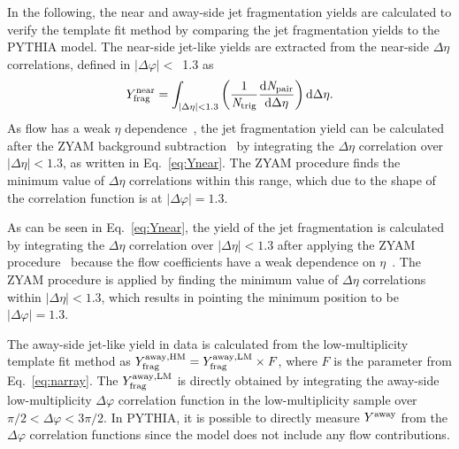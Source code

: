In the following, the near and away-side jet fragmentation yields are calculated to verify the template fit method by comparing the jet fragmentation yields to the PYTHIA model.
The near-side jet-like yields are extracted from the near-side $\Delta\eta$ correlations, defined in $|\Delta\varphi|<$~1.3 as
\begin{eqnarray}
Y^\mathrm{near}_{\rm{frag}} = \int_{|\Delta \eta|<1.3} \left( \frac{1}{\it{N}_{\rm{trig}}} \frac{ \rm{d}\it{}N_{\rm{pair}} }{ \rm{d}\Delta\eta } \right) \rm{d} \Delta\eta.
\label{eq:Ynear}
\end{eqnarray}
As flow has a weak $\eta$ dependence~\cite{ATLAS:2011ah,PHENIX:2018hho,ALICE:2016tlx}, the jet fragmentation yield can be calculated after the ZYAM background subtraction~\cite{Ajitanand:2005jj} by integrating the $\Delta\eta$ correlation over $|\Delta\eta|<1.3$, as written in Eq.~\ref{eq:Ynear}. The ZYAM procedure finds the minimum value of $\Delta\eta$ correlations within this range, which due to the shape of the correlation function is at $|\Delta\varphi|=1.3$.

As can be seen in Eq.~\ref{eq:Ynear}, the yield of the jet fragmentation is calculated by integrating the $\Delta\eta$ correlation over $|\Delta\eta|<1.3$ after applying the ZYAM procedure~\cite{Ajitanand:2005jj} because the flow coefficients have a weak dependence on $\eta$~\cite{ATLAS:2011ah,PHENIX:2018hho,ALICE:2016tlx}. The ZYAM procedure is applied by finding the minimum value of $\Delta\eta$ correlations within $|\Delta\eta|<1.3$, which results in pointing the minimum position to be $|\Delta\varphi|=1.3$.

The away-side jet-like yield in data is calculated from the low-multiplicity template fit method as $Y^{\rm{away, HM}}_{\mathrm{frag}} = Y^{\rm{away, LM}}_{\mathrm{frag}} \times F$, where $F$ is the parameter from Eq.~\ref{eq:narray}. The $Y^{\rm{away, LM}}_{\mathrm{frag}}$ is directly obtained by integrating the away-side low-multiplicity $\Delta\varphi$ correlation function in the low-multiplicity sample over $\pi/2 < \Delta\varphi < 3\pi/2$.
In PYTHIA, it is possible to directly measure  $Y^{\rm{away}}$ from the $\Delta\varphi$ correlation functions since the model does not include any flow contributions.

